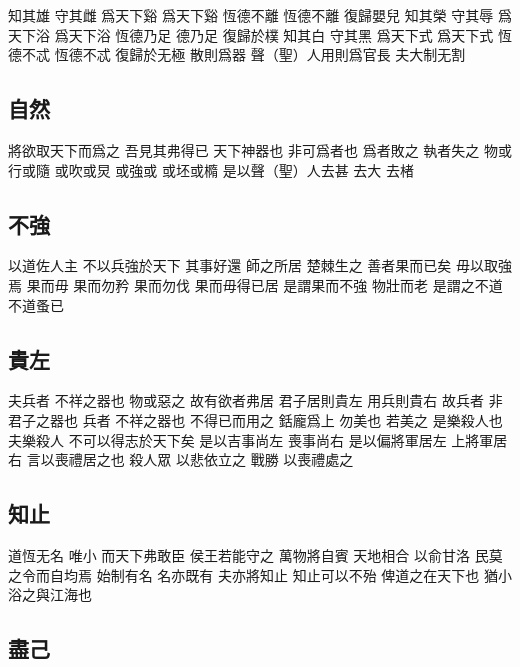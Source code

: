 \documentclass[a5paper,zihao=-4,oneside,UTF8]{ctexart}
\begin{document}
知其雄 守其雌 爲天下谿 爲天下谿 恆德不離 恆德不離 復歸嬰兒 
知其榮 守其辱 爲天下浴 爲天下浴 恆德乃足 德乃足 復歸於樸 
知其白 守其黑 爲天下式 爲天下式 恆德不忒 恆德不忒 復歸於无極 
散則爲器 聲（聖）人用則爲官長 夫大制无割 



\subsection{自然}



將欲取天下而爲之 吾見其弗得已 
天下神器也 非可爲者也 
爲者敗之 執者失之 
物或行或隨 或吹或炅 或強或 或坯或橢 
是以聲（聖）人去甚 去大 去楮 



\subsection{不強}



以道佐人主 不以兵強於天下 其事好還 
師之所居 楚棘生之 
善者果而已矣 毋以取強焉 
果而毋 果而勿矜 果而勿伐 果而毋得已居 是謂果而不強 
物壯而老 是謂之不道 不道蚤已 



\subsection{貴左}



夫兵者 不祥之器也 物或惡之 故有欲者弗居 
君子居則貴左 用兵則貴右 
故兵者 非君子之器也 兵者 不祥之器也 不得已而用之 銛龐爲上 
勿美也 若美之 是樂殺人也 
夫樂殺人 不可以得志於天下矣 
是以吉事尚左 喪事尚右 
是以偏將軍居左 上將軍居右 言以喪禮居之也 
殺人眾 以悲依立之 戰勝 以喪禮處之 



\subsection{知止}



道恆无名 
唯小 而天下弗敢臣 
侯王若能守之 萬物將自賓 天地相合 以俞甘洛 民莫之令而自均焉 
始制有名 名亦既有 夫亦將知止 知止可以不殆 
俾道之在天下也 猶小浴之與江海也 



\subsection{盡己}
\end{document}
